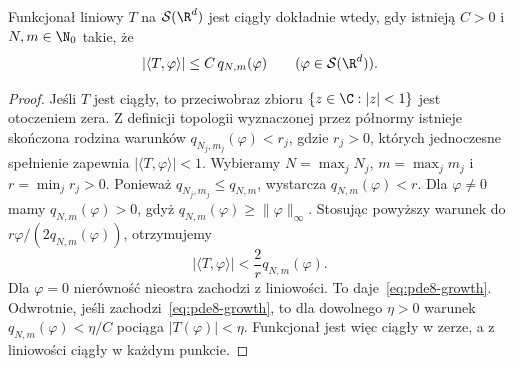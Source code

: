 \begin{twierdzenie}
\label{thm:pde8-growth}
Funkcjonał liniowy $T$ na $\mathcal S(\R^d)$ jest ciągły
dokładnie wtedy, gdy istnieją $C>0$ i $N,m\in\N_0$ takie, że
\begin{equation}\label{eq:pde8-growth}
 |\langle T,\varphi\rangle|\le C\,q_{N,m}(\varphi)
 \qquad(\varphi\in\mathcal S(\R^d)).
\end{equation}
\end{twierdzenie}
\begin{proof}
Jeśli $T$ jest ciągły, to przeciwobraz zbioru
$\{z\in\C:|z|<1\}$ jest otoczeniem zera.
Z definicji topologii wyznaczonej przez półnormy
istnieje skończona rodzina warunków
$q_{N_j,m_j}(\varphi)<r_j$, gdzie $r_j>0$,
których jednoczesne spełnienie zapewnia
$|\langle T,\varphi\rangle|<1$.
Wybieramy $N=\max_j N_j$, $m=\max_j m_j$
i $r=\min_j r_j>0$.
Ponieważ $q_{N_j,m_j}\le q_{N,m}$, wystarcza
$q_{N,m}(\varphi)<r$.
Dla $\varphi\ne0$ mamy $q_{N,m}(\varphi)>0$,
gdyż $q_{N,m}(\varphi)\ge\|\varphi\|_\infty$.
Stosując powyższy warunek do
$r\varphi/(2q_{N,m}(\varphi))$, otrzymujemy
\[
 |\langle T,\varphi\rangle|
 <\frac{2}{r}q_{N,m}(\varphi).
\]
Dla $\varphi=0$ nierówność nieostra zachodzi
z liniowości. To daje~\eqref{eq:pde8-growth}.
Odwrotnie, jeśli zachodzi~\eqref{eq:pde8-growth},
to dla dowolnego $\eta>0$ warunek
$q_{N,m}(\varphi)<\eta/C$ pociąga
$|T(\varphi)|<\eta$. Funkcjonał jest więc ciągły
w zerze, a z liniowości ciągły w każdym punkcie.
\end{proof}

